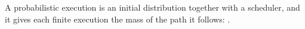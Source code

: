 \begin{definition}
  \label{def:probabilistic-execution}
  \leanok
  A probabilistic execution is an initial distribution together with a scheduler, and it gives each finite execution the mass of the path it follows: .
\end{definition}
